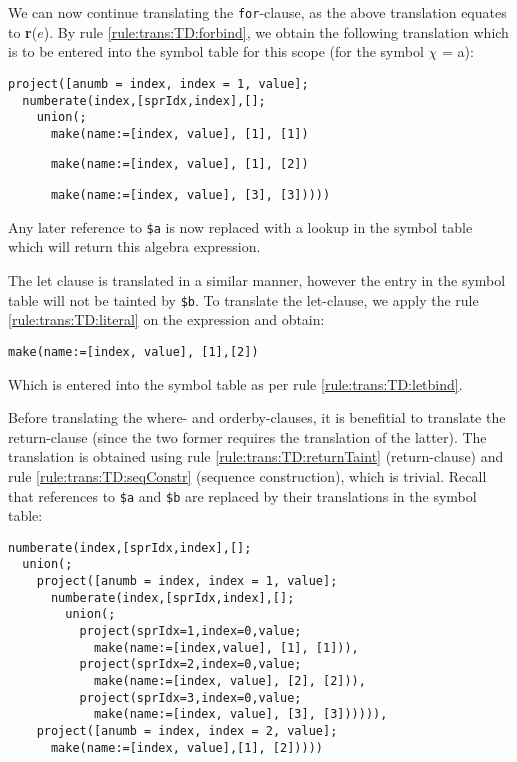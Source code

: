 We can now continue translating the \texttt{for}-clause, as the above translation
equates to \textbf{r}($e$). By rule \ref{rule:trans:TD:forbind}, we obtain the
following translation which is to be entered into the symbol table for this
scope (for the symbol $\chi$ = a):

\begin{Verbatim}
project([anumb = index, index = 1, value];
  numberate(index,[sprIdx,index],[];
    union(;
      make(name:=[index, value], [1], [1])
      \end{Verbatim}
      \begin{Verbatim}
      make(name:=[index, value], [1], [2])
      \end{Verbatim}
      \begin{Verbatim}
      make(name:=[index, value], [3], [3]))))
\end{Verbatim}

Any later reference to \texttt{\$a} is now replaced with a lookup in the symbol
table which will return this algebra expression.

The let clause is translated in a similar manner, however the entry in the
symbol table will not be tainted by \texttt{\$b}. To translate the let-clause,
we apply the rule \ref{rule:trans:TD:literal} on the expression and obtain:

\begin{Verbatim}
make(name:=[index, value], [1],[2])
\end{Verbatim}

Which is entered into the symbol table as per rule \ref{rule:trans:TD:letbind}.

Before translating the where- and orderby-clauses, it is benefitial to
translate the return-clause (since the two former requires the translation of
the latter). The translation is obtained using rule
\ref{rule:trans:TD:returnTaint} (return-clause) and rule
\ref{rule:trans:TD:seqConstr} (sequence construction), which is trivial. Recall
that references to \texttt{\$a} and \texttt{\$b} are replaced by their
translations in the symbol table:

\begin{Verbatim}
numberate(index,[sprIdx,index],[];
  union(;
    project([anumb = index, index = 1, value];
      numberate(index,[sprIdx,index],[];
        union(;
          project(sprIdx=1,index=0,value;
            make(name:=[index,value], [1], [1])),
          project(sprIdx=2,index=0,value;
            make(name:=[index, value], [2], [2])),
          project(sprIdx=3,index=0,value;
            make(name:=[index, value], [3], [3]))))),
    project([anumb = index, index = 2, value];
      make(name:=[index, value],[1], [2]))))
\end{Verbatim}

